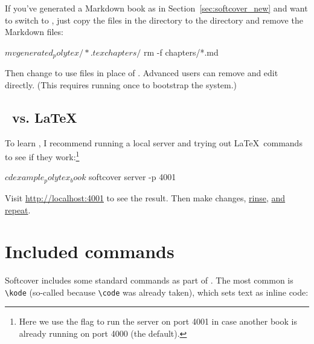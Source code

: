 
If you've generated a Markdown book as in Section~\ref{sec:softcover_new} and want to switch to \PolyTeX, just copy the files in the  directory to the  directory and remove the Markdown files:

\begin{code}
$ mv generated_polytex/*.tex chapters/
$ rm -f chapters/*.md
\end{code}

\noindent Then change  to use  files in place of . Advanced users can remove  and edit  directly. (This requires running  once to bootstrap the system.)

\subsection{\PolyTeX\ vs. \LaTeX} %
\label{sec:polytex_vs_latex}

To learn \PolyTeX, I recommend running a local server and trying out \LaTeX\ commands to see if they work:\footnote{Here we use the  flag to run the server on port 4001 in case another book is already running on port 4000 (the default).}

\begin{code}
$ cd example_polytex_book
$ softcover server -p 4001
\end{code}

\noindent Visit \href{http://localhost:4001}{http://localhost:4001} to see the result. Then make changes, \href{http://www.urbandictionary.com/define.php?term=rinse%20repeat}{rinse}, \href{http://www.urbandictionary.com/define.php?term=rinse%20repeat}{and repeat}.





\section{Included commands} %
\label{sec:included_commands}

Softcover includes some standard commands as part of . The most common is \verb+\kode+ (so-called because \verb+\code+ was already taken), which sets text as inline code:

